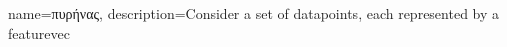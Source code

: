 {name={\foreignlanguage{greek}{πυρήνας}}, 
	description={Consider a set of \glspl{datapoint}, each represented by a \gls{featurevec} 
}}

